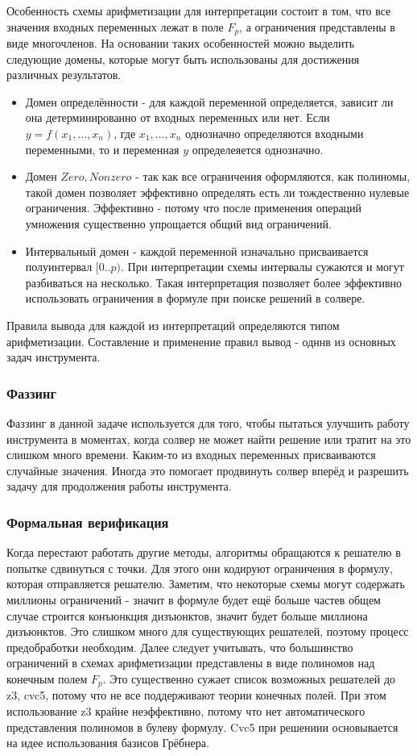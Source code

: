 \documentclass[a4paper]{article}
\begin{document}
Особенность схемы арифметизации для интерпретации состоит в том, что все значения входных переменных лежат в поле $F_p$, а ограничения представлены в виде многочленов. На основании таких особенностей можно выделить следующие домены, которые могут быть использованы для достижения различных результатов.
\begin{itemize}
    \item Домен определённости - для каждой переменной определяется, зависит ли она детерминированно от входных переменных или нет. Если $y = f(x_1, ..., x_n)$, где $x_1, ..., x_n$ однозначно определяются входными переменными, то и переменная $y$ определеяется однозначно.
    \item Домен ${Zero, Nonzero}$ - так как все ограничения оформляются, как полиномы, такой домен позволяет эффективно определять есть ли тождественно нулевые ограничения. Эффективно - потому что после применения операций умножения существенно упрощается общий вид ограничений.
    \item Интервальный домен - каждой переменной изначально присваивается полуинтервал $[0..p)$. При интерпретации схемы интервалы сужаются и могут разбиваться на несколько. Такая интерпретация позволяет более эффективно использовать ограничения в формуле при поиске решений в солвере.
\end{itemize}

Правила вывода для каждой из интерпретаций определяются типом арифметизации. Составление и применение правил вывод - одннв из основных задач инструмента.

\subsubsection{Фаззинг}
Фаззинг в данной задаче используется для того, чтобы пытаться улучшить работу инструмента в моментах, когда солвер не может найти решение или тратит на это слишком много времени. Каким-то из входных переменных присваиваются случайные значения. Иногда это помогает продвинуть солвер вперёд и разрешить задачу для продолжения работы инструмента.

\subsubsection{Формальная верификация}

Когда перестают работать другие методы, алгоритмы обращаются к решателю в попытке сдвинуться с точки. Для этого они кодируют ограничения в формулу, которая отправляется решателю. Заметим, что некоторые схемы могут содержать миллионы ограничений - значит в формуле будет ещё больше частев общем случае строится конъюнкция дизъюнктов, значит будет больше миллиона дизъюнктов. Это слишком много для существующих решателей, поэтому процесс предобработки необходим. Далее следует учитывать, что большинство ограничений в схемах арифметизации представлены в виде полиномов над конечным полем $F_p$. Это существенно сужает список возможных решателей до z3, cvc5, потому что не все поддерживают теории конечных полей. При этом использование z3 крайне неэффективно, потому что нет автоматического представления полиномов в булеву формулу. Cvc5 при решениии основывается на идее использования базисов Грёбнера\cite{litlink16}.
\end{document}
